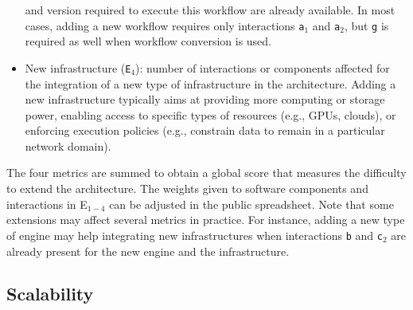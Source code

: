 \documentclass[preprint,3p,twocolumn]{elsarticle}
\newcommand{\todo}[2]{\pdfmargincomment[color=red,author=#1,open=true]{#2}}
\newcommand{\correction}[1]{\color{blue}#1\color{black}\xspace}
\begin{document}
\begin{itemize}[leftmargin=0cm,itemindent=0.35cm,itemsep=0cm]
  and version required to execute this workflow are already
  available. In most cases, adding a new workflow requires only
  interactions \texttt{a$_1$} and \texttt{a$_2$}, but \texttt{g}
  is required as well when workflow conversion is used. 
\item New infrastructure (\texttt{E$_4$}): number of interactions or
  components affected for the integration of a new type of infrastructure in
  the architecture. Adding a new infrastructure typically aims at providing more
  computing or storage power, enabling access to specific types of resources
  (e.g., GPUs, clouds), or  enforcing execution policies (e.g.,
  constrain data to remain in a particular network domain).
\end{itemize}
The four metrics are summed to obtain a global score that measures the
difficulty to extend the architecture. \correction{The weights given to software components and interactions in E$_{1-4}$ can be adjusted in the public spreadsheet.} 
Note that some extensions may
affect several metrics in practice. For instance, adding a new type
of engine may help integrating new infrastructures when interactions
\texttt{b} and \texttt{c$_2$} are already present for the new engine
and the infrastructure.

\subsection{\correction{Scalability}}
\end{document}
